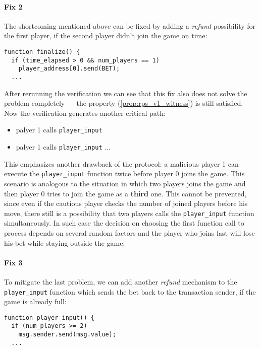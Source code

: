 \paragraph{Fix 2}

The shortcoming mentioned above can be fixed by adding a \emph{refund} possibility for the first player, if the second player
didn't join the game on time:
\begin{lstlisting}
function finalize() {
  if (time_elapsed > 0 && num_players == 1)
    player_address[0].send(BET);
  ...
\end{lstlisting}

After rerunning the verification we can see that this fix also does not solve the problem completely --- the property 
(\ref{prop:rps_v1_witness}) is still satisfied.
Now the verification generates another critical path:
\begin{itemize}
\item palyer 1 calls \lstinline{player_input}
\item palyer 1 calls \lstinline{player_input}
...
\end{itemize}
This emphasizes another drawback of the protocol:
a malicious player 1 can execute the \lstinline{player_input} function twice before player 0 joins the game.
This scenario is analogous to the situation in which two players joins the game and then player 0 tries to join
the game as a \textbf{third} one.
This cannot be prevented, since even if the cautious player checks the number of joined players before his move,
there still is a possibility that two players calls the \lstinline{player_input} function simultaneously.
In such case the decision on choosing the first function call to process depends on several random factors and the player
who joins last will lose his bet while staying outside the game.

\paragraph{Fix 3}

To mitigate the last problem, we can add another \emph{refund} mechanism to the \lstinline{player_input} function
which sends the bet back to the transaction sender, if the game is already full:
\begin{lstlisting}
function player_input() {
  if (num_players >= 2)
    msg.sender.send(msg.value);
  ...
\end{lstlisting}

